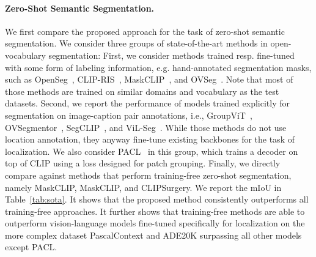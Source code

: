 \documentclass[10pt,twocolumn,letterpaper]{article}
\begin{document}
\paragraph{Zero-Shot Semantic Segmentation.}
We first compare the proposed approach for the task of zero-shot semantic segmentation. We consider three groups of state-of-the-art methods in open-vocabulary segmentation: First, we consider methods trained resp. fine-tuned with some form of labeling information, e.g. hand-annotated segmentation masks, such as OpenSeg~\citep{ghiasi2022scaling}, CLIP-RIS~\citep{yu2023zero}, MaskCLIP~\citep{ding2022open}, and OVSeg~\citep{liang2023open}. Note that most of those methods are trained on similar domains and vocabulary as the test datasets. Second, we report the performance of models trained explicitly for segmentation on image-caption pair annotations, i.e., GroupViT~\citep{xu2022groupvit}, OVSegmentor~\citep{xu2023learning}, SegCLIP~\citep{luo2023segclip}, and ViL-Seg~\citep{liu2022open}. While those methods do not use location annotation, they anyway fine-tune existing backbones for the task of localization.
We also consider PACL~\citep{mukhoti2023open} in this group, which trains a decoder on top of CLIP using a loss designed for patch grouping.
Finally, we directly compare against methods that perform training-free zero-shot segmentation, namely MaskCLIP, MaskCLIP, and CLIPSurgery.
We report the mIoU in Table~\ref{tab:sota}. 
It shows that the proposed method consistently outperforms all training-free approaches. 
It further shows that training-free methods are able to outperform vision-language models fine-tuned specifically for localization on the more complex dataset PascalContext and ADE20K surpassing all other models except PACL. 

\vspace{-5mm}
\end{document}
